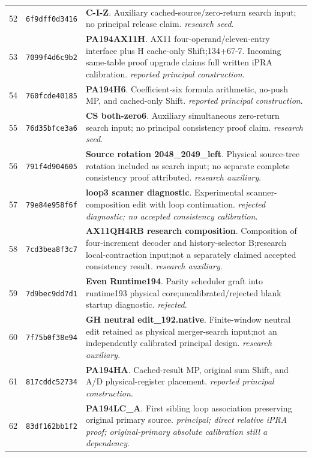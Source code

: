 \begin{longtable}{@{}r p{} p{}@{}}
52 & \texttt{6f9dff0d3416} & \textbf{C-I-Z}. Auxiliary cached-source/zero-return search input; no principal release claim. \emph{research seed}.\\[3pt]
53 & \texttt{7099f4d6c9b2} & \textbf{PA194AX11H}. AX11 four-operand/eleven-entry interface plus H cache-only Shift;134+67-7. Incoming same-table proof upgrade claims full written iPRA calibration. \emph{reported principal construction}.\\[3pt]
54 & \texttt{760fcde40185} & \textbf{PA194H6}. Coefficient-six formula arithmetic, no-push MP, and cached-only Shift. \emph{reported principal construction}.\\[3pt]
55 & \texttt{76d35bfce3a6} & \textbf{CS both-zero6}. Auxiliary simultaneous zero-return search input; no principal consistency proof claim. \emph{research seed}.\\[3pt]
56 & \texttt{791f4d904605} & \textbf{Source rotation 2048\_2049\_left}. Physical source-tree rotation included as search input; no separate complete consistency proof attributed. \emph{research auxiliary}.\\[3pt]
57 & \texttt{79e84e958f6f} & \textbf{loop3 scanner diagnostic}. Experimental scanner-composition edit with loop continuation. \emph{rejected diagnostic; no accepted consistency calibration}.\\[3pt]
58 & \texttt{7cd3bea8f3c7} & \textbf{AX11QH4RB research composition}. Composition of four-increment decoder and history-selector B;research local-contraction input;not a separately claimed accepted consistency result. \emph{research auxiliary}.\\[3pt]
59 & \texttt{7d9bec9dd7d1} & \textbf{Even Runtime194}. Parity scheduler graft into runtime193 physical core;uncalibrated/rejected blank startup diagnostic. \emph{rejected}.\\[3pt]
60 & \texttt{7f75b0f38e94} & \textbf{GH neutral edit\_192.native}. Finite-window neutral edit retained as physical merger-search input;not an independently calibrated principal design. \emph{research auxiliary}.\\[3pt]
61 & \texttt{817cddc52734} & \textbf{PA194HA}. Cached-result MP, original sum Shift, and A/D physical-register placement. \emph{reported principal construction}.\\[3pt]
62 & \texttt{83df162bb1f2} & \textbf{PA194LC\_A}. First sibling loop association preserving original primary source. \emph{principal; direct relative iPRA proof; original-primary absolute calibration still a dependency}.\\[3pt]

\end{longtable}
